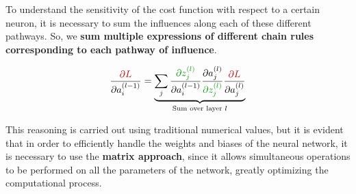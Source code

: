 To understand the sensitivity of the cost function with respect to a certain neuron, it is necessary to sum the influences along each of these different pathways. So, we \textbf{sum multiple expressions of different chain rules corresponding to each pathway of influence}.

\vspace{-0.5cm}
$$\frac{\textcolor{myred}{\partial L}}{\partial a_{i}^{(l-1)}} = \underbrace{\sum_{j}\frac{\textcolor{mygreen}{\partial z_{j}^{(l)}}}{\partial a_{i}^{(l-1)}}  \frac{\partial a_{j}^{(l)}}{\textcolor{mygreen}{\partial z_{j}^{(l)}}} \frac{\textcolor{myred}{\partial L}}{\partial a_{j}^{(l)}}}_\textrm{Sum over layer $l$}$$

This reasoning is carried out using traditional numerical values, but it is evident that in order to efficiently handle the weights and biases of the neural network, it is necessary to use the \textbf{matrix approach}, since it allows simultaneous operations to be performed on all the parameters of the network, greatly optimizing the computational process.
